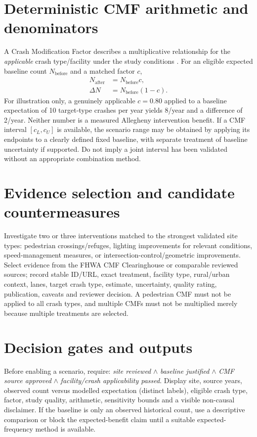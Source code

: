 \documentclass[11pt,a4paper,openany]{report}
\begin{document}
\section{Deterministic CMF arithmetic and denominators}
A Crash Modification Factor describes a multiplicative relationship for the \emph{applicable} crash type/facility under the study conditions \cite{CMF}. For an eligible expected baseline count $N_{\mathrm{before}}$ and a matched factor $c$,
\begin{align}
N_{\mathrm{after}} &= N_{\mathrm{before}}c,\\
\Delta N &= N_{\mathrm{before}}(1-c).
\end{align}
For illustration only, a genuinely applicable $c=0.80$ applied to a baseline expectation of 10 target-type crashes per year yields 8/year and a difference of 2/year. Neither number is a measured Allegheny intervention benefit. If a CMF interval $[c_L,c_U]$ is available, the scenario range may be obtained by applying its endpoints to a clearly defined fixed baseline, with separate treatment of baseline uncertainty if supported. Do not imply a joint interval has been validated without an appropriate combination method.

\section{Evidence selection and candidate countermeasures}
Investigate two or three interventions matched to the strongest validated site types: pedestrian crossings/refuges, lighting improvements for relevant conditions, speed-management measures, or intersection-control/geometric improvements. Select evidence from the FHWA CMF Clearinghouse or comparable reviewed sources; record stable ID/URL, exact treatment, facility type, rural/urban context, lanes, target crash type, estimate, uncertainty, quality rating, publication, caveats and reviewer decision. A pedestrian CMF must not be applied to all crash types, and multiple CMFs must not be multiplied merely because multiple treatments are selected.

\section{Decision gates and outputs}
Before enabling a scenario, require: \emph{site reviewed} $\land$ \emph{baseline justified} $\land$ \emph{CMF source approved} $\land$ \emph{facility/crash applicability passed}. Display site, source years, observed count versus modelled expectation (distinct labels), eligible crash type, factor, study quality, arithmetic, sensitivity bounds and a visible non-causal disclaimer. If the baseline is only an observed historical count, use a descriptive comparison or block the expected-benefit claim until a suitable expected-frequency method is available.
\end{document}

